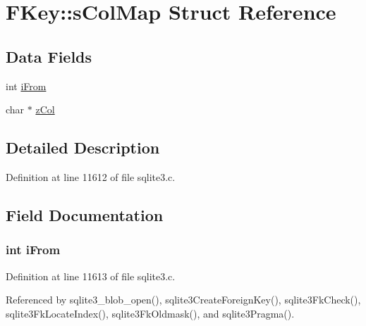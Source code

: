 \hypertarget{struct_f_key_1_1s_col_map}{}\section{F\+Key\+:\+:s\+Col\+Map Struct Reference}
\label{struct_f_key_1_1s_col_map}
\subsection*{Data Fields}
\begin{DoxyCompactItemize}
\item 
int \hyperlink{struct_f_key_1_1s_col_map_a33da3a713733333038cc674653f09577}{i\+From}
\item 
char $\ast$ \hyperlink{struct_f_key_1_1s_col_map_a7df4bd4e0f5bc6b14b662863df03b0f6}{z\+Col}
\end{DoxyCompactItemize}


\subsection{Detailed Description}


Definition at line 11612 of file sqlite3.\+c.



\subsection{Field Documentation}
\hypertarget{struct_f_key_1_1s_col_map_a33da3a713733333038cc674653f09577}{}
\subsubsection[{i\+From}]{\setlength{\rightskip}{0pt plus 5cm}int i\+From}\label{struct_f_key_1_1s_col_map_a33da3a713733333038cc674653f09577}


Definition at line 11613 of file sqlite3.\+c.



Referenced by sqlite3\+\_\+blob\+\_\+open(), sqlite3\+Create\+Foreign\+Key(), sqlite3\+Fk\+Check(), sqlite3\+Fk\+Locate\+Index(), sqlite3\+Fk\+Oldmask(), and sqlite3\+Pragma().

\hypertarget{struct_f_key_1_1s_col_map_a7df4bd4e0f5bc6b14b662863df03b0f6}{}
